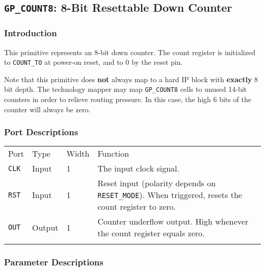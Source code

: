 \documentclass[11pt]{article}
\renewcommand\emph\textbf
\newcommand{\tokenstyle}[1]{\texttt{#1}}
\newcommand{\whenstyle}[1]{{\fontseries{sb}\selectfont#1}}
\newcommand{\thinhline}{\Xhline{1\arrayrulewidth}}
\newcommand{\thickhline}{\Xhline{2.5\arrayrulewidth}}
\begin{document}
\pagebreak
\subsection{\tokenstyle{GP\_COUNT8}: 8-Bit Resettable Down Counter}
\label{gp-count8}

\subsubsection{Introduction}
This primitive represents an 8-bit down counter. The count register is initialized to \tokenstyle{COUNT\_TO} at
power-on reset, and to 0 by the reset pin.

Note that this primitive does \emph{not} always map to a hard IP block with \emph{exactly} 8 bit depth. The technology
mapper may map \tokenstyle{GP\_COUNT8} cells to unused 14-bit counters in order to relieve routing pressure.
In this case, the high 6 bits of the counter will always be zero.

\subsubsection{Port Descriptions}

\begin{tabularx}{\textwidth}{lllX}
\thinhline
\whenstyle{Port} & \whenstyle{Type} & \whenstyle{Width} & \whenstyle{Function} \\
\thickhline
\tokenstyle{CLK} & Input & 1 & The input clock signal. \\
\thinhline
\tokenstyle{RST} & Input & 1 & Reset input (polarity depends on \tokenstyle{RESET\_MODE}).
	When triggered, resets the count register to zero. \\
\thinhline
\tokenstyle{OUT} & Output & 1 & Counter underflow output. High whenever the count register equals zero. \\
\thinhline
\end{tabularx}

\subsubsection{Parameter Descriptions}
\end{document}
